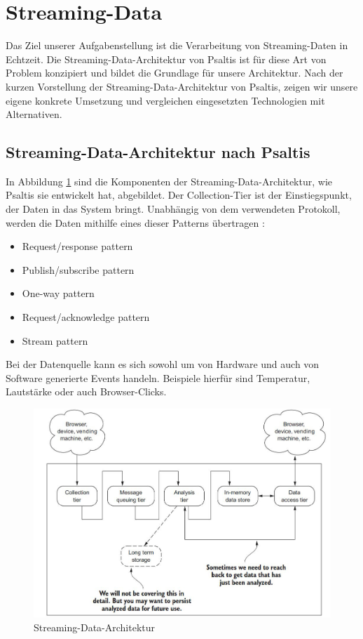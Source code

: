 \section{Streaming-Data}

Das Ziel unserer Aufgabenstellung ist die Verarbeitung von Streaming-Daten in Echtzeit. Die Streaming-Data-Architektur
von Psaltis \cite{psaltis2017streaming} ist für diese Art von Problem konzipiert und bildet die Grundlage für
unsere Architektur. Nach der kurzen Vorstellung der Streaming-Data-Architektur von Psaltis, zeigen wir unsere eigene konkrete
Umsetzung und vergleichen eingesetzten Technologien mit Alternativen.

\subsection{Streaming-Data-Architektur nach Psaltis}

In Abbildung \ref{fig:streaming_data_architecture-psaltis} sind die Komponenten der Streaming-Data-Architektur, wie Psaltis \cite{psaltis2017streaming}
sie entwickelt hat, abgebildet. Der Collection-Tier ist der Einstiegspunkt, der Daten in das System bringt. Unabhängig von dem verwendeten
Protokoll, werden die Daten mithilfe eines dieser Patterns übertragen \cite{psaltis2017streaming}:
\begin{itemize}
    \item Request/response pattern
    \item Publish/subscribe pattern
    \item One-way pattern
    \item Request/acknowledge pattern
    \item Stream pattern
\end{itemize}

Bei der Datenquelle kann es sich sowohl um von Hardware und auch von Software generierte Events handeln. Beispiele hierfür sind
Temperatur, Lautstärke oder auch Browser-Clicks.


\begin{figure}
    \includegraphics[width=\textwidth]{images/streaming_data_architecture-psaltis.jpg}
    \caption{Streaming-Data-Architektur \cite{psaltis2017streaming}}
    \label{fig:streaming_data_architecture-psaltis}
\end{figure}


